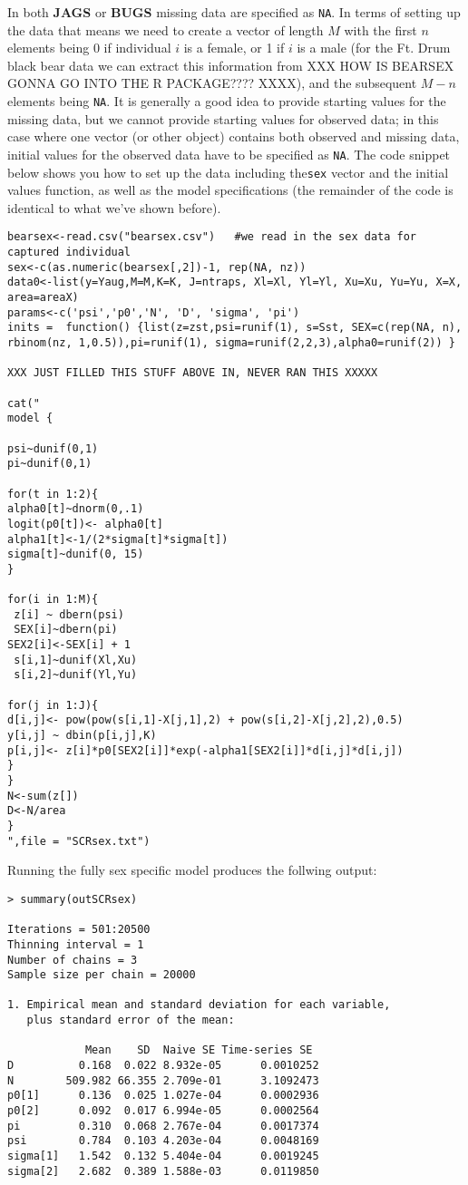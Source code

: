 In both {\bf JAGS} or {\bf BUGS} missing data are specified as {\tt NA}. In terms of setting up the data that means we need to create a vector of 
length $M$ with the first $n$ elements being 0 if individual $i$ is a female, or 1 if $i$ is a male (for the Ft. Drum black bear data we can extract 
this information from XXX HOW IS BEARSEX GONNA GO INTO THE R PACKAGE???? XXXX), and the subsequent $M-n$ elements being {\tt NA}.  It is generally a 
good idea to provide starting values for the missing data, but we cannot provide starting values for observed data; in this case where one vector 
(or other object) contains both observed and missing data, initial values for the observed data have to be specified as {\tt NA}. 
The code snippet below shows you how to set up the  data including the{\tt sex} vector and the initial values function, 
as well as the {\jags} model specifications (the remainder of the code is identical to what we've shown before).


{\small
\begin{verbatim}
bearsex<-read.csv("bearsex.csv")   #we read in the sex data for captured individual
sex<-c(as.numeric(bearsex[,2])-1, rep(NA, nz))
data0<-list(y=Yaug,M=M,K=K, J=ntraps, Xl=Xl, Yl=Yl, Xu=Xu, Yu=Yu, X=X, area=areaX)
params<-c('psi','p0','N', 'D', 'sigma', 'pi')
inits =  function() {list(z=zst,psi=runif(1), s=Sst, SEX=c(rep(NA, n), rbinom(nz, 1,0.5)),pi=runif(1), sigma=runif(2,2,3),alpha0=runif(2)) }

XXX JUST FILLED THIS STUFF ABOVE IN, NEVER RAN THIS XXXXX

cat("
model {

psi~dunif(0,1)
pi~dunif(0,1)

for(t in 1:2){
alpha0[t]~dnorm(0,.1)
logit(p0[t])<- alpha0[t]
alpha1[t]<-1/(2*sigma[t]*sigma[t])
sigma[t]~dunif(0, 15)
}

for(i in 1:M){
 z[i] ~ dbern(psi)
 SEX[i]~dbern(pi)
SEX2[i]<-SEX[i] + 1
 s[i,1]~dunif(Xl,Xu)
 s[i,2]~dunif(Yl,Yu)

for(j in 1:J){
d[i,j]<- pow(pow(s[i,1]-X[j,1],2) + pow(s[i,2]-X[j,2],2),0.5)
y[i,j] ~ dbin(p[i,j],K)
p[i,j]<- z[i]*p0[SEX2[i]]*exp(-alpha1[SEX2[i]]*d[i,j]*d[i,j])
}
}
N<-sum(z[])
D<-N/area
}
",file = "SCRsex.txt")
\end{verbatim}
}

Running the fully sex specific model produces the follwing output: 
{\small
\begin{verbatim}
> summary(outSCRsex)

Iterations = 501:20500
Thinning interval = 1
Number of chains = 3
Sample size per chain = 20000

1. Empirical mean and standard deviation for each variable,
   plus standard error of the mean:

            Mean    SD  Naive SE Time-series SE
D          0.168  0.022 8.932e-05      0.0010252
N        509.982 66.355 2.709e-01      3.1092473
p0[1]      0.136  0.025 1.027e-04      0.0002936
p0[2]      0.092  0.017 6.994e-05      0.0002564
pi         0.310  0.068 2.767e-04      0.0017374
psi        0.784  0.103 4.203e-04      0.0048169
sigma[1]   1.542  0.132 5.404e-04      0.0019245
sigma[2]   2.682  0.389 1.588e-03      0.0119850
\end{verbatim}
}



